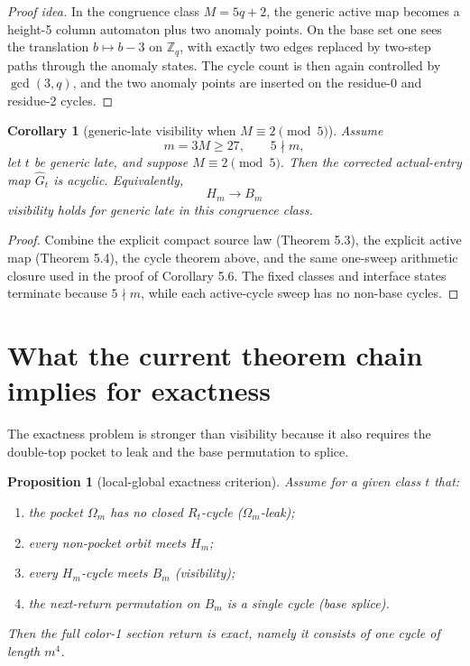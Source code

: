 \documentclass[11pt]{article}
\newtheorem{corollary}[theorem]{Corollary}
\newtheorem{proposition}[theorem]{Proposition}
\newcommand{\Z}{\mathbb Z}
\newcommand{\1}{\mathbf 1}
\newcommand{\Hm}{H_m}
\newcommand{\Bm}{B_m}
\newcommand{\Gt}{\widehat G_t}
\newcommand{\Om}{\Omega_m}
\begin{document}
\begin{proof}[Proof idea]
In the congruence class \(M=5q+2\), the generic active map becomes a height-5 column automaton plus two anomaly points.
On the base set one sees the translation \(b\mapsto b-3\) on \(\Z_q\), with exactly two edges replaced by two-step paths through the anomaly states.
The cycle count is then again controlled by \(\gcd(3,q)\), and the two anomaly points are inserted on the residue-0 and residue-2 cycles.
\end{proof}

\begin{corollary}[generic-late visibility when \(M\equiv 2 \pmod 5\)]
Assume
\[
m=3M\ge 27,\qquad 5\nmid m,
\]
let \(t\) be generic late, and suppose \(M\equiv 2 \pmod 5\).
Then the corrected actual-entry map \(\Gt\) is acyclic.
Equivalently,
\[
\Hm \to \Bm
\]
visibility holds for generic late in this congruence class.
\end{corollary}

\begin{proof}
Combine the explicit compact source law (Theorem 5.3), the explicit active map (Theorem 5.4), the cycle theorem above, and the same one-sweep arithmetic closure used in the proof of Corollary 5.6.
The fixed classes and interface states terminate because \(5\nmid m\), while each active-cycle sweep has no non-base cycles.
\end{proof}

\section{What the current theorem chain implies for exactness}

The exactness problem is stronger than visibility because it also requires the double-top pocket to leak and the base permutation to splice.

\begin{proposition}[local-global exactness criterion]
Assume for a given class \(t\) that:
\begin{enumerate}[label=\textup{(\arabic*)},leftmargin=2.8em]
\item the pocket \(\Om\) has no closed \(R_t\)-cycle (\(\Omega_m\)-leak);
\item every non-pocket orbit meets \(\Hm\);
\item every \(\Hm\)-cycle meets \(\Bm\) (visibility);
\item the next-return permutation on \(\Bm\) is a single cycle (base splice).
\end{enumerate}
Then the full color-1 section return is exact, namely it consists of one cycle of length \(m^4\).
\end{proposition}
\end{document}
